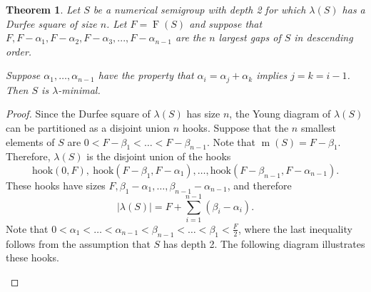 \documentclass{amsproc}
\DeclareMathOperator{\F}{F}
\DeclareMathOperator{\m}{m}
\newcommand{\hook}{\text{hook}}
\newtheorem{theorem}{Theorem}[section]
\theoremstyle{definition}
\theoremstyle{remark}
\numberwithin{equation}{section}
\begin{document}
\begin{theorem}
    \label{general durfee}
    Let $S$ be a numerical semigroup with depth 2 for which $\lambda(S)$ has a Durfee square of size $n$. Let $F = \F(S)$ and suppose that $F, F-\alpha_1, F-\alpha_2, F-\alpha_3,...,F-\alpha_{n-1}$ are the $n$ largest gaps of $S$ in descending order.
    
Suppose $\alpha_1,\ldots, \alpha_{n-1}$ have the property that $\alpha_i=\alpha_j+\alpha_k$ implies $j=k=i-1$.
    Then $S$ is $\lambda$-minimal.
\end{theorem}
\begin{proof}
Since the Durfee square of $\lambda(S)$ has size $n$, the Young diagram of $\lambda(S)$ can be partitioned as a disjoint union $n$ hooks. Suppose that the $n$ smallest elements of $S$ are $0<F-\beta_1<\dots<F-\beta_{n-1}$. Note that $\m(S)=F-\beta_1$. Therefore, $\lambda(S)$ is the disjoint union of the hooks 
\[
\hook(0,F),\ \hook(F-\beta_1,F-\alpha_1),\ldots, \hook(F-\beta_{n-1},F-\alpha_{n-1}).
\]
These hooks have sizes $F, \beta_1-\alpha_1,\dots, \beta_{n-1}-\alpha_{n-1}$, and therefore 
\[
|\lambda(S)|=F+\sum_{i=1}^{n-1}(\beta_i-\alpha_i).
\]
Note that $0<\alpha_1<\dots<\alpha_{n-1}<\beta_{n-1}<\dots<\beta_1<\frac{F}{2}$, where the last inequality follows from the assumption that $S$ has depth 2.
The following diagram illustrates these hooks.
\begin{center}
\begin{figure}
\end{figure}
\end{center}
\end{proof}
\end{document}
